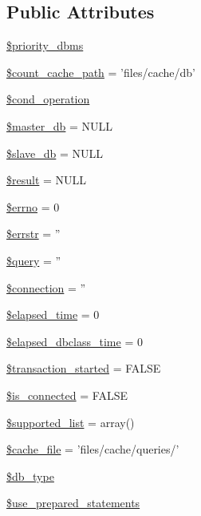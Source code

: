 \subsection*{Public Attributes}
\begin{DoxyCompactItemize}
\item 
\hyperlink{classDB_a082292b9ca3855cbddd3a74e9490ca82}{\$priority\+\_\+dbms}
\item 
\hyperlink{classDB_aca72b9b3a39bb5e5d2e444f20db2c6bb}{\$count\+\_\+cache\+\_\+path} = 'files/cache/db'
\item 
\hyperlink{classDB_a85f8f65c37474b0e65d844e1f01f39b0}{\$cond\+\_\+operation}
\item 
\hyperlink{classDB_ad0a3ae175a659516131cfc6cd615d15c}{\$master\+\_\+db} = N\+U\+L\+L
\item 
\hyperlink{classDB_a0a811a4446882ee9edf0ed846e8926f3}{\$slave\+\_\+db} = N\+U\+L\+L
\item 
\hyperlink{classDB_a74e74ee9d3311aa1e8107b8accd05e29}{\$result} = N\+U\+L\+L
\item 
\hyperlink{classDB_af99d759f7fb3bbadd579d72e686d1cf1}{\$errno} = 0
\item 
\hyperlink{classDB_ae006f35821aba99713b834fa6a69e55b}{\$errstr} = ''
\item 
\hyperlink{classDB_a32ebabea908efd805a83db48fec3ab52}{\$query} = ''
\item 
\hyperlink{classDB_ac9071e31f8241ad644430537f39a16ce}{\$connection} = ''
\item 
\hyperlink{classDB_af5a3fdd4e0078a185dac8c2727fb4f2c}{\$elapsed\+\_\+time} = 0
\item 
\hyperlink{classDB_a0483c1bfe18fa5e8bbe7915f9c8187a7}{\$elapsed\+\_\+dbclass\+\_\+time} = 0
\item 
\hyperlink{classDB_a39a0eef56f82082ca4c69bcad1f12a31}{\$transaction\+\_\+started} = F\+A\+L\+S\+E
\item 
\hyperlink{classDB_aac22b6ebcd8f78c2f70646d381f933dc}{\$is\+\_\+connected} = F\+A\+L\+S\+E
\item 
\hyperlink{classDB_ac09dd547a22963632e063c9ab68b7707}{\$supported\+\_\+list} = array()
\item 
\hyperlink{classDB_a9952a27cbf07942e5bb8853ab95b5bdb}{\$cache\+\_\+file} = 'files/cache/queries/'
\item 
\hyperlink{classDB_a78868b4c2301aa813d9e2d481424f1e8}{\$db\+\_\+type}
\item 
\hyperlink{classDB_a9902aee7d8900a597670fce92c7eb74b}{\$use\+\_\+prepared\+\_\+statements}
\end{DoxyCompactItemize}
